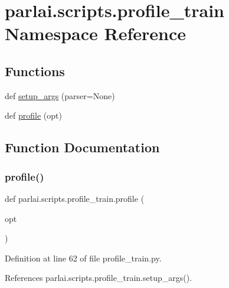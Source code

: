 \hypertarget{namespaceparlai_1_1scripts_1_1profile__train}{}\section{parlai.\+scripts.\+profile\+\_\+train Namespace Reference}
\label{namespaceparlai_1_1scripts_1_1profile__train}
\subsection*{Functions}
\begin{DoxyCompactItemize}
\item 
def \hyperlink{namespaceparlai_1_1scripts_1_1profile__train_abc73daf8a16d21ce56906342ec15cda9}{setup\+\_\+args} (parser=None)
\item 
def \hyperlink{namespaceparlai_1_1scripts_1_1profile__train_a72ecdcc9932f8566d611093a2daeaa2a}{profile} (opt)
\end{DoxyCompactItemize}


\subsection{Function Documentation}
\mbox{\label{namespaceparlai_1_1scripts_1_1profile__train_a72ecdcc9932f8566d611093a2daeaa2a}} 
\subsubsection{\texorpdfstring{profile()}{profile()}}
{\footnotesize\ttfamily def parlai.\+scripts.\+profile\+\_\+train.\+profile (\begin{DoxyParamCaption}\item[{}]{opt }\end{DoxyParamCaption})}



Definition at line 62 of file profile\+\_\+train.\+py.



References parlai.\+scripts.\+profile\+\_\+train.\+setup\+\_\+args().

